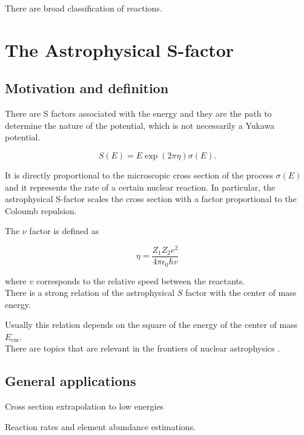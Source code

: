 \documentclass[openany]{book}
\begin{document}
There are broad classification of reactions. 

\section{The Astrophysical S-factor} \label{sec:sFactor}
\subsection{Motivation and definition} \label{sub:sfactorMotivationDefinition}

There are S factors associated with the energy and they are the path to determine the nature of the potential, which is not necessarily a Yukawa potential.

\begin{equation} \label{eq:sfactor_definition}
	S(E) = E \exp({2\pi\eta}) \sigma({E}).
\end{equation} %

It is directly proportional to the microscopic cross section of the process $\sigma(E)$ and it represents the rate of a certain nuclear reaction. 
In particular, the astrophysical S-factor 	scales the cross section with a factor proportional to the Coloumb repulsion. 

The $\nu$ factor is defined as 

\begin{equation} \label{eq:sfactor_sommerfeld}
	\eta = \frac{Z_1Z_2e^2}{4\pi\epsilon_0\hbar v}
\end{equation}

where $v$ corresponds to the relative speed between the reactants. \\ 
There is a strong relation of the astrophysical $S$ factor with the center of mass energy. 

Usually this relation depends on the square of the energy of the center of mass $E_{\mathrm{cm}}$. \\

There are topics that are relevant in the frontiers of nuclear astrophysics  \cite{bertulani_kajino_2016}. 

\subsection{General applications} \label{sub:sfactorApplications}

Cross section extrapolation to low energies

Reaction rates and element abundance estimations. 
\end{document}
